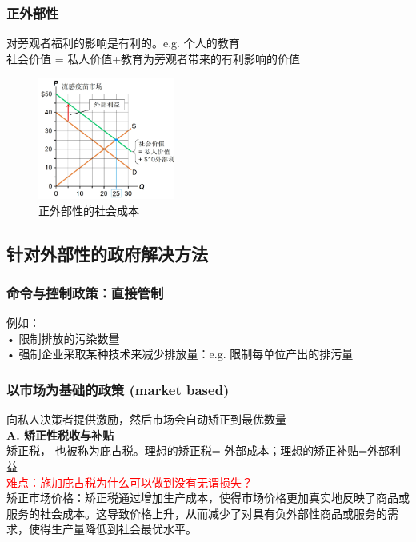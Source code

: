\documentclass[12pt,a4paper]{article}
\begin{document}
\subsubsection{正外部性}
\noindent 对旁观者福利的影响是有利的。e.g. 个人的教育\\
社会价值 = 私人价值+教育为旁观者带来的有利影响的价值\\
\begin{figure}[H] 
  \centering %
  \includegraphics[width=0.4\textwidth]{正外部性.png} 
  \caption{正外部性的社会成本} %
\end{figure}

\subsection{针对外部性的政府解决方法}
\subsubsection{命令与控制政策：直接管制}
\noindent 例如：\\
• 限制排放的污染数量\\
• 强制企业采取某种技术来减少排放量：e.g. 限制每单位产出的排污量
\subsubsection{以市场为基础的政策 (market based)}
向私人决策者提供激励，然后市场会自动矫正到最优数量\\

\textbf{A. 矫正性税收与补贴}\\

矫正税， 也被称为庇古税。理想的矫正税= 外部成本；理想的矫正补贴=外部利益\\

\textcolor{red}{难点：施加庇古税为什么可以做到没有无谓损失？}\\

矫正市场价格：矫正税通过增加生产成本，使得市场价格更加真实地反映了商品或服务的社会成本。这导致价格上升，从而减少了对具有负外部性商品或服务的需求，使得生产量降低到社会最优水平。\\
\end{document}
